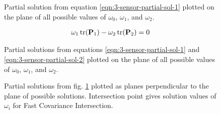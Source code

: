 \documentclass[letterpaper, 10 pt, conference]{ieeeconf}  %
\begin{document}
\begin{figure}[htb]
   \begin{center}
      
   \end{center}
   \caption{Partial solution from equation \eqref{eqn:3-sensor-partial-sol-1} plotted on the plane of all possible values of $\omega_0$, $\omega_1$, and $\omega_2$.}
\end{figure}

\begin{gather}
   \omega_1 \operatorname{tr}({{\mathbf{P}}}_1) - \omega_2 \operatorname{tr}({{\mathbf{P}}}_2) = 0 \label{eqn:3-sensor-partial-sol-2}
\end{gather}

\begin{figure}[htb]
   \begin{center}
      
   \end{center}
   \caption{Partial solutions from equations \eqref{eqn:3-sensor-partial-sol-1} and \eqref{eqn:3-sensor-partial-sol-2} plotted on the plane of all possible values of $\omega_0$, $\omega_1$, and $\omega_2$.}
   \label{fig:3-sensor-partial-sols}
\end{figure}

\begin{figure}[htb]
   \begin{center}
      
   \end{center}
   \caption{Partial solutions from fig. \ref{fig:3-sensor-partial-sols} plotted as planes perpendicular to the plane of possible solutions. Intersection point gives solution values of $\omega_i$ for Fast Covariance Intersection.}
\end{figure}
\end{document}
